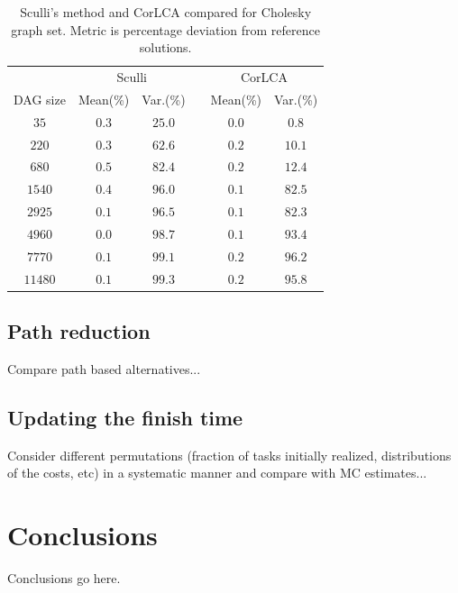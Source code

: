 \documentclass[12pt]{article}
\begin{document}
      \begin{table}
	\caption{Sculli's method and CorLCA compared for Cholesky graph set. Metric is percentage deviation from reference solutions.} 
	\begin{center}	
		\begin{tabular}{c c c c c c}
                  \toprule
                  & \multicolumn{2}{c}{Sculli} && \multicolumn{2}{c}{CorLCA} \\
                  \cmidrule{2-3} \cmidrule{5-6}
                  DAG size &  Mean(\%) & Var.(\%) && Mean(\%) & Var.(\%) \\
                  \cmidrule{1-6}
                  $35$ & $0.3$ & $25.0$ && $0.0$ & $0.8$ \\
                  $220$ & $0.3$ & $62.6$ && $0.2$ & $10.1$ \\              
                  $680$ & $0.5$ & $82.4$ && $0.2$ & $12.4$ \\
                  $1540$ & $0.4$ & $96.0$ && $0.1$ & $82.5$ \\
                  $2925$ & $0.1$ & $96.5$ && $0.1$ & $82.3$ \\
                  $4960$ & $0.0$ & $98.7$ && $0.1$ & $93.4$ \\
                  $7770$ & $0.1$ & $99.1$ && $0.2$ & $96.2$ \\
                  $11480$ & $0.1$ & $99.3$ && $0.2$ & $95.8$ \\
		\bottomrule
		\end{tabular}
		\label{tb.sculli_corlca}
	\end{center}	
      \end{table}
      

\subsection{Path reduction}
\label{subsect.results_path_reduction}

Compare path based alternatives...

\subsection{Updating the finish time}
\label{subsect.results_updating}

Consider different permutations (fraction of tasks initially realized, distributions of the costs, etc) in a systematic manner and compare with MC estimates... 

\section{Conclusions}
\label{sect.conclusions}

Conclusions go here. 



\end{document}
